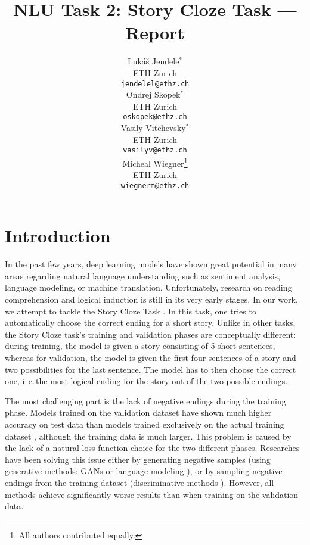 \documentclass{article}
\title{NLU Task 2: Story Cloze Task --- Report}
\author{
  Luk\'{a}\v{s} Jendele$^\ast$\\
  ETH Zurich\\
  \texttt{jendelel@ethz.ch}\\
  \And
  Ondrej Skopek$^\ast$\\
  ETH Zurich\\
  \texttt{oskopek@ethz.ch}\\
  \And
  Vasily Vitchevsky$^\ast$\\
  ETH Zurich\\
  \texttt{vasilyv@ethz.ch}\\
  \And
  Micheal Wiegner\thanks{All authors contributed equally.}\\
  ETH Zurich\\
  \texttt{wiegnerm@ethz.ch}\\
}
\begin{document}
\maketitle


\section{Introduction}\label{sec:intro}
In the past few years, deep learning models have shown great potential in many areas regarding natural language understanding such as sentiment analysis, language modeling, or machine translation. Unfortunately, research on reading comprehension and logical induction is still in its very early stages. In our work, we attempt to tackle the Story Cloze Task \citep{Mostafazadeh2016AStories}. In this task, one tries to automatically choose the correct ending for a short story. Unlike in other tasks, the Story Cloze task's training and validation phases are conceptually different: during training, the model is given a  story consisting of 5 short sentences, whereas for validation, the model is given the first four sentences of a story and two possibilities for the last sentence. The model has to then choose the correct one, i.\,e.\,the most logical ending for the story out of the two possible endings.

The most challenging part is the lack of negative endings during the training phase. Models trained on the validation dataset \citep{Srinivasan2018ATest,Roemmele2017AnTest} have shown much higher accuracy on test data than models trained exclusively on the actual training dataset \citep{Roemmele2017AnTest,Wang2017ConditionalComprehension}, although the training data is much larger. This problem is caused by the lack of a natural loss function choice for the two different phases. Researches have been solving this issue either by generating negative samples (using generative methods: GANs \citep{Wang2017ConditionalComprehension} or language modeling \citep{Roemmele2017AnTest}), or by sampling negative endings from the training dataset (discriminative methods \citep{Roemmele2017AnTest}). However, all methods achieve significantly worse results than when training on the validation data.
\end{document}
